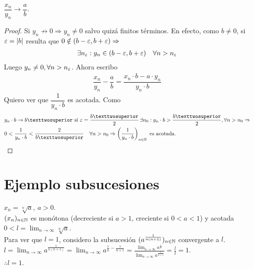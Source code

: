 \begin{prop}
  \(\dfrac{x_n}{y_n} \to \dfrac{a}{b}\).
  \begin{proof}
    Si \(y_n \not \to 0 \Rightarrow y_n \neq 0\) salvo quizá finitos términos. En efecto, como \(b \neq 0\), si \(\varepsilon = |b|\) resulta que \(0 \notin (b - \varepsilon, b + \varepsilon) \Rightarrow\)
    \begin{align*}
      \exists n_{\varepsilon} : y_n \in (b-\varepsilon, b+\varepsilon) \quad \forall n > n_{\varepsilon}
    \end{align*} Luego \(y_n \neq 0, \forall n > n_{\varepsilon}\). Ahora escribo \begin{align*}
      \dfrac{x_n}{y_n} - \dfrac{a}{b} = \dfrac{x_n \cdot b - a \cdot y_n}{y_n \cdot b}
    \end{align*} Quiero ver que \(\dfrac{1}{y_n \cdot b}\) es acotada. Como
    \begin{align*}
       & y_n \cdot b \to b² \text{ si } \e = \dfrac{b²}{2} \, \exists n_0 : y_n \cdot b > \dfrac{b²}{2}, \forall n > n_0 \Rightarrow                   \\
       & 0 < \dfrac{1}{y_n \cdot b} < \dfrac{2}{b²} \quad \forall n > n_0 \Rightarrow \left(\dfrac{1}{y_n \cdot b}\right)_{n \in \N} \text{ es acotada}.
    \end{align*}
  \end{proof}
\end{prop}

\section{Ejemplo subsucesiones}

\begin{eg}
  \(x_n = \sqrt[n]{a}, \ a > 0\). \\
  \((x_n)_{n \in \mathbb{N}}\) es monótona (decreciente si \(a > 1\), creciente si \(0 < a < 1\)) y acotada \(0 < l = \lim_{n \to \infty} \sqrt[n]{a}\). \\
  Para ver que \(l = 1\), considero la subsucesión \((a^{\frac{1}{n(n+1)}})_{n \in \mathbb{N}}\) convergente a \(l\). \\
  \(l = \lim_{n \to \infty} a^{\frac{1}{n(n+1)}} = \lim_{n \to \infty} a^{\frac{1}{n} - \frac{1}{n+1}} =
    \frac{\lim_{n \to \infty} a^{\frac{1}{n}}}{\lim_{n \to \infty} a^{\frac{1}{n+1}}} = \frac{l}{l} = 1.\) \\
  \(\therefore l = 1\).
\end{eg}

